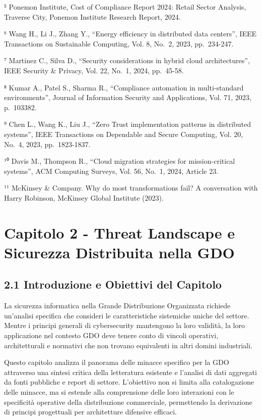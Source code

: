 \documentclass{report}
\begin{document}
⁵ Ponemon Institute, Cost of Compliance Report 2024: Retail Sector
Analysis, Traverse City, Ponemon Institute Research Report, 2024.

⁶ Wang H., Li J., Zhang Y., ``Energy efficiency in distributed data
centers'', IEEE Transactions on Sustainable Computing, Vol. 8, No.~2,
2023, pp.~234-247.

⁷ Martinez C., Silva D., ``Security considerations in hybrid cloud
architectures'', IEEE Security \& Privacy, Vol. 22, No.~1, 2024,
pp.~45-58.

⁸ Kumar A., Patel S., Sharma R., ``Compliance automation in
multi-standard environments'', Journal of Information Security and
Applications, Vol. 71, 2023, p.~103382.

⁹ Chen L., Wang K., Liu J., ``Zero Trust implementation patterns in
distributed systems'', IEEE Transactions on Dependable and Secure
Computing, Vol. 20, No.~4, 2023, pp.~1823-1837.

¹⁰ Davis M., Thompson R., ``Cloud migration strategies for
mission-critical systems'', ACM Computing Surveys, Vol. 56, No.~1, 2024,
Article 23.

¹¹ McKinsey \& Company. Why do most transformations fail? A conversation
with Harry Robinson, McKinsey Global Institute (2023).

\section{Capitolo 2 - Threat Landscape e Sicurezza Distribuita nella
GDO}\label{capitolo-2---threat-landscape-e-sicurezza-distribuita-nella-gdo}

\subsection{2.1 Introduzione e Obiettivi del
Capitolo}\label{introduzione-e-obiettivi-del-capitolo}

La sicurezza informatica nella Grande Distribuzione Organizzata richiede
un'analisi specifica che consideri le caratteristiche sistemiche uniche
del settore. Mentre i principi generali di cybersecurity mantengono la
loro validità, la loro applicazione nel contesto GDO deve tenere conto
di vincoli operativi, architetturali e normativi che non trovano
equivalenti in altri domini industriali.

Questo capitolo analizza il panorama delle minacce specifico per la GDO
attraverso una sintesi critica della letteratura esistente e l'analisi
di dati aggregati da fonti pubbliche e report di settore. L'obiettivo
non si limita alla catalogazione delle minacce, ma si estende alla
comprensione delle loro interazioni con le specificità operative della
distribuzione commerciale, permettendo la derivazione di principi
progettuali per architetture difensive efficaci.
\end{document}
